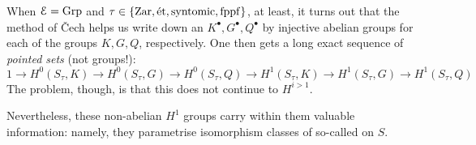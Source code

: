             When $\mathcal{E} = \mathrm{Grp}$ and $\tau \in \{ \mathrm{Zar}, \mathrm{\acute{e}t}, \mathrm{syntomic}, \mathrm{fppf} \}$, at least, it turns out that the method of \v{C}ech helps us write down an  $K^{\bullet}, G^{\bullet}, Q^{\bullet}$ by injective abelian groups for each of the groups $K, G, Q$, respectively. One then gets a long exact sequence of \textit{pointed sets} (not groups!):
                $$1 \to H^0(S_{\tau}, K) \to H^0(S_{\tau}, G) \to H^0(S_{\tau}, Q) \to H^1(S_{\tau}, K) \to H^1(S_{\tau}, G) \to H^1(S_{\tau}, Q)$$
            The problem, though, is that this does not continue to $H^{i > 1}$.

            Nevertheless, these non-abelian $H^1$ groups carry within them valuable information: namely, they parametrise isomorphism classes of so-called  on $S$.

